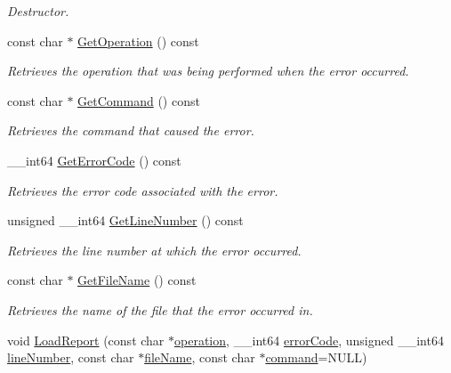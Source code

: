 \begin{DoxyCompactItemize}
\begin{DoxyCompactList}\small\item\em Destructor. \item\end{DoxyCompactList}\item 
const char $\ast$ \hyperlink{class_error_report_a90cf97320116d4dd63034ca0cc61099e}{GetOperation} () const 
\begin{DoxyCompactList}\small\item\em Retrieves the operation that was being performed when the error occurred. \item\end{DoxyCompactList}\item 
const char $\ast$ \hyperlink{class_error_report_ac135268d3c04564e26cae9416a6427f7}{GetCommand} () const 
\begin{DoxyCompactList}\small\item\em Retrieves the command that caused the error. \item\end{DoxyCompactList}\item 
\_\-\_\-int64 \hyperlink{class_error_report_a031d36c93f1b12db39ccf4b3f7a5e0f4}{GetErrorCode} () const 
\begin{DoxyCompactList}\small\item\em Retrieves the error code associated with the error. \item\end{DoxyCompactList}\item 
unsigned \_\-\_\-int64 \hyperlink{class_error_report_aac1796dac68e6715b1fb93b8b517173f}{GetLineNumber} () const 
\begin{DoxyCompactList}\small\item\em Retrieves the line number at which the error occurred. \item\end{DoxyCompactList}\item 
const char $\ast$ \hyperlink{class_error_report_ae295f4b1776386215e475d95cf1b9032}{GetFileName} () const 
\begin{DoxyCompactList}\small\item\em Retrieves the name of the file that the error occurred in. \item\end{DoxyCompactList}\item 
void \hyperlink{class_error_report_a31c4488e3b999c35794aeecda8df8485}{LoadReport} (const char $\ast$\hyperlink{class_error_report_a24ae8a14692b673266f93fa869e4f543}{operation}, \_\-\_\-int64 \hyperlink{class_error_report_a627028539c72742cec0c460eb1240fb5}{errorCode}, unsigned \_\-\_\-int64 \hyperlink{class_error_report_a41b39a5f3d34f1c959970766d5157abc}{lineNumber}, const char $\ast$\hyperlink{class_error_report_aa5f68a3df09866ceac9b933f04444f50}{fileName}, const char $\ast$\hyperlink{class_error_report_a3924c0754aef927067733907ba12409e}{command}=NULL)

\end{DoxyCompactItemize}
